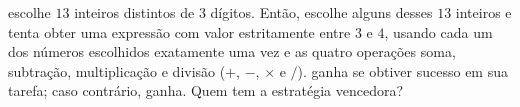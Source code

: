  escolhe $13$ inteiros distintos de $3$ dígitos. Então,  escolhe alguns desses $13$ inteiros e tenta obter uma expressão com valor estritamente entre $3$ e $4$, usando cada um dos números escolhidos exatamente uma vez e as quatro operações soma, subtração, multiplicação e divisão ($+$, $-$, $\times$ e $/$).  ganha se obtiver sucesso em sua tarefa; caso contrário,  ganha. Quem tem a estratégia vencedora?
